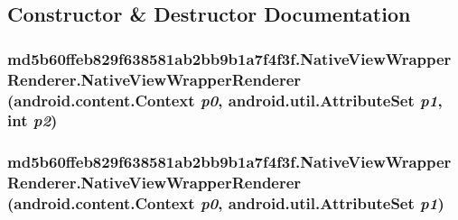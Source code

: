 \subsection{Constructor \& Destructor Documentation}
\hypertarget{classmd5b60ffeb829f638581ab2bb9b1a7f4f3f_1_1_native_view_wrapper_renderer_6b9d648e0b1da0d659615ff7f77d7448}{
\subsubsection[{NativeViewWrapperRenderer}]{\setlength{\rightskip}{0pt plus 5cm}md5b60ffeb829f638581ab2bb9b1a7f4f3f.NativeViewWrapperRenderer.NativeViewWrapperRenderer (android.content.Context {\em p0}, \/  android.util.AttributeSet {\em p1}, \/  int {\em p2})}}
\label{classmd5b60ffeb829f638581ab2bb9b1a7f4f3f_1_1_native_view_wrapper_renderer_6b9d648e0b1da0d659615ff7f77d7448}


\hypertarget{classmd5b60ffeb829f638581ab2bb9b1a7f4f3f_1_1_native_view_wrapper_renderer_7420e67b434dbf414eb77a0095b2e091}{
\subsubsection[{NativeViewWrapperRenderer}]{\setlength{\rightskip}{0pt plus 5cm}md5b60ffeb829f638581ab2bb9b1a7f4f3f.NativeViewWrapperRenderer.NativeViewWrapperRenderer (android.content.Context {\em p0}, \/  android.util.AttributeSet {\em p1})}}
\label{classmd5b60ffeb829f638581ab2bb9b1a7f4f3f_1_1_native_view_wrapper_renderer_7420e67b434dbf414eb77a0095b2e091}


